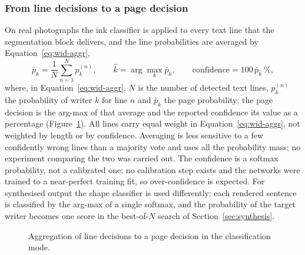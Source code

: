 \subsubsection{From line decisions to a page decision}

On real photographs the ink classifier is applied to every text line that the segmentation block delivers, and the line probabilities are averaged by Equation~\ref{eq:wid-aggr},
\begin{equation}
\bar p_k=\frac1N\sum_{n=1}^Np^{(n)}_k,\qquad\hat k=\arg\max_k\bar p_k,\qquad\text{confidence}=100\,\bar p_{\hat k}\ \%,
\label{eq:wid-aggr}
\end{equation}
where, in Equation~\ref{eq:wid-aggr}, $N$ is the number of detected text lines, $p^{(n)}_k$ the probability of writer $k$ for line $n$ and $\bar p_k$ the page probability; the page decision is the arg-max of that average and the reported confidence its value as a percentage (Figure~\ref{fig:wid-aggr}).
All lines carry equal weight in Equation~\ref{eq:wid-aggr}, not weighted by length or by confidence.
Averaging is less sensitive to a few confidently wrong lines than a majority vote and uses all the probability mass; no experiment comparing the two was carried out.
The confidence is a softmax probability, not a calibrated one: no calibration step exists and the networks were trained to a near-perfect training fit, so over-confidence is expected.
For synthesised output the shape classifier is used differently: each rendered sentence is classified by the arg-max of a single softmax, and the probability of the target writer becomes one score in the best-of-$N$ search of Section~\ref{sec:synthesis}.

\begin{figure}[h]
\centering
{}
\caption{Aggregation of line decisions to a page decision in the classification mode.}
\label{fig:wid-aggr}
\end{figure}


